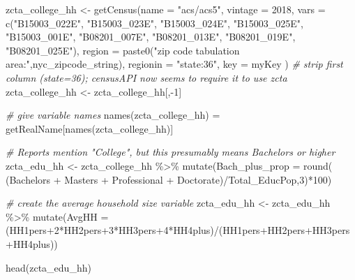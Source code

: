 \documentclass[
  openany]{book}
\newenvironment{Shaded}{\begin{snugshade}}{\end{snugshade}}
\newcommand{\AttributeTok}[1]{\textcolor[rgb]{0.77,0.63,0.00}{#1}}
\newcommand{\CommentTok}[1]{\textcolor[rgb]{0.56,0.35,0.01}{\textit{#1}}}
\newcommand{\DecValTok}[1]{\textcolor[rgb]{0.00,0.00,0.81}{#1}}
\newcommand{\FunctionTok}[1]{\textcolor[rgb]{0.00,0.00,0.00}{#1}}
\newcommand{\NormalTok}[1]{#1}
\newcommand{\OtherTok}[1]{\textcolor[rgb]{0.56,0.35,0.01}{#1}}
\newcommand{\SpecialCharTok}[1]{\textcolor[rgb]{0.00,0.00,0.00}{#1}}
\newcommand{\StringTok}[1]{\textcolor[rgb]{0.31,0.60,0.02}{#1}}
\begin{document}
\begin{Shaded}
\begin{Highlighting}[]
\NormalTok{zcta\_college\_hh }\OtherTok{\textless{}{-}} \FunctionTok{getCensus}\NormalTok{(}\AttributeTok{name =} \StringTok{"acs/acs5"}\NormalTok{,}
                             \AttributeTok{vintage =} \DecValTok{2018}\NormalTok{,}
                             \AttributeTok{vars =} \FunctionTok{c}\NormalTok{(}\StringTok{"B15003\_022E"}\NormalTok{, }\StringTok{"B15003\_023E"}\NormalTok{, }\StringTok{"B15003\_024E"}\NormalTok{, }
                                      \StringTok{"B15003\_025E"}\NormalTok{, }\StringTok{"B15003\_001E"}\NormalTok{,}
                                      \StringTok{"B08201\_007E"}\NormalTok{, }\StringTok{"B08201\_013E"}\NormalTok{, }
                                      \StringTok{"B08201\_019E"}\NormalTok{, }\StringTok{"B08201\_025E"}\NormalTok{),}
                             \AttributeTok{region =} \FunctionTok{paste0}\NormalTok{(}\StringTok{"zip code tabulation area:"}\NormalTok{,nyc\_zipcode\_string),}
                             \AttributeTok{regionin =} \StringTok{"state:36"}\NormalTok{,}
                             \AttributeTok{key =}\NormalTok{ myKey}
\NormalTok{)}
\CommentTok{\# strip first column (state=36); censusAPI now seems to require it to use zcta}
\NormalTok{zcta\_college\_hh }\OtherTok{\textless{}{-}}\NormalTok{ zcta\_college\_hh[,}\SpecialCharTok{{-}}\DecValTok{1}\NormalTok{]}

\CommentTok{\# give variable names}
\FunctionTok{names}\NormalTok{(zcta\_college\_hh) }\OtherTok{=}\NormalTok{ getRealName[}\FunctionTok{names}\NormalTok{(zcta\_college\_hh)]}

\CommentTok{\# Reports mention "College", but this presumably means Bachelors or higher}
\NormalTok{zcta\_edu\_hh }\OtherTok{\textless{}{-}}\NormalTok{ zcta\_college\_hh }\SpecialCharTok{\%\textgreater{}\%}
                  \FunctionTok{mutate}\NormalTok{(}\AttributeTok{Bach\_plus\_prop =} \FunctionTok{round}\NormalTok{( (Bachelors }\SpecialCharTok{+}\NormalTok{ Masters }\SpecialCharTok{+}
\NormalTok{                                                    Professional }\SpecialCharTok{+}
\NormalTok{                                                    Doctorate)}\SpecialCharTok{/}\NormalTok{Total\_EducPop,}\DecValTok{3}\NormalTok{)}\SpecialCharTok{*}\DecValTok{100}\NormalTok{)}

\CommentTok{\# create the average household size variable}
\NormalTok{zcta\_edu\_hh }\OtherTok{\textless{}{-}}\NormalTok{ zcta\_edu\_hh }\SpecialCharTok{\%\textgreater{}\%}
  \FunctionTok{mutate}\NormalTok{(}\AttributeTok{AvgHH =}\NormalTok{ (HH1pers}\SpecialCharTok{+}\DecValTok{2}\SpecialCharTok{*}\NormalTok{HH2pers}\SpecialCharTok{+}\DecValTok{3}\SpecialCharTok{*}\NormalTok{HH3pers}\SpecialCharTok{+}\DecValTok{4}\SpecialCharTok{*}\NormalTok{HH4plus)}\SpecialCharTok{/}\NormalTok{(HH1pers}\SpecialCharTok{+}\NormalTok{HH2pers}\SpecialCharTok{+}\NormalTok{HH3pers}\SpecialCharTok{+}\NormalTok{HH4plus)) }

\FunctionTok{head}\NormalTok{(zcta\_edu\_hh)}
\end{Highlighting}
\end{Shaded}
\end{document}
